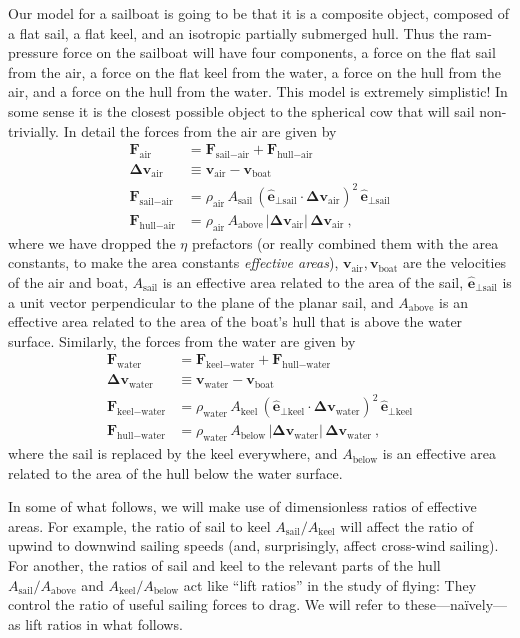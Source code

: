 \documentclass[letterpaper]{article}
\renewcommand{\vec}[1]{\boldsymbol{#1}}
\newcommand{\uvec}{\vec{\hat{e}}}
\newcommand{\air}{\text{air}}
\newcommand{\water}{\text{water}}
\newcommand{\boat}{\text{boat}}
\newcommand{\sail}{\text{sail}}
\newcommand{\keel}{\text{keel}}
\newcommand{\hull}{\text{hull}}
\renewcommand{\above}{\text{above}}
\newcommand{\below}{\text{below}}
\newcommand{\vair}{\vec{v}_\air}
\newcommand{\vwater}{\vec{v}_\water}
\newcommand{\vboat}{\vec{v}_\boat}
\begin{document}
Our model for a sailboat is going to be that it is a composite object, composed of a flat sail, a flat keel, and an isotropic partially submerged hull.
Thus the ram-pressure force on the sailboat will have four components, a force on the flat sail from the air, a force on the flat keel from the water, a force on the hull from the air, and a force on the hull from the water.
This model is extremely simplistic!
In some sense it is the closest possible object to the spherical cow that will sail non-trivially.
In detail the forces from the air are given by
\begin{align}\label{eq:startmodel}
  \vec{F}_\air &= \vec{F}_{\sail-\air} + \vec{F}_{\hull-\air}
  \\
  \vec{\Delta v}_\air &\equiv \vair - \vboat \label{eq:deltav}
  \\
  \vec{F}_{\sail-\air} & = \rho_\air\,A_\sail\,(\uvec_{\perp\sail}\cdot\vec{\Delta v}_\air)^2\,\uvec_{\perp\sail} \label{eq:Fsailair}
  \\
  \vec{F}_{\hull-\air} & = \rho_\air\,A_{\above}\,|\vec{\Delta v}_\air|\,\vec{\Delta v}_\air \label{eq:Fhullair} ~,
\end{align}
where we have dropped the $\eta$ prefactors (or really combined them with the area constants, to make the area constants \emph{effective areas}), $\vair,\vboat$ are the velocities of the air and boat, $A_\sail$ is an effective area related to the area of the sail, $\uvec_{\perp\sail}$ is a unit vector perpendicular to the plane of the planar sail, and $A_{\above}$ is an effective area related to the area of the boat's hull that is above the water surface.
Similarly, the forces from the water are given by
\begin{align}
  \vec{F}_\water &= \vec{F}_{\keel-\water} + \vec{F}_{\hull-\water}
  \\
  \vec{\Delta v}_\water &\equiv \vwater - \vboat
  \\
  \vec{F}_{\keel-\water} & = \rho_\water\,A_\keel\,(\uvec_{\perp\keel}\cdot\vec{\Delta v}_\water)^2\,\uvec_{\perp\keel}
  \\
  \vec{F}_{\hull-\water} & = \rho_\water\,A_{\below}\,|\vec{\Delta v}_\water|\,\vec{\Delta v}_\water ~,\label{eq:endmodel}
\end{align}
where the sail is replaced by the keel everywhere, and $A_{\below}$ is an effective area related to the area of the hull below the water surface.

In some of what follows, we will make use of dimensionless ratios of effective areas.
For example, the ratio of sail to keel $A_\sail/A_\keel$ will affect the ratio of upwind to downwind sailing speeds (and, surprisingly, affect cross-wind sailing).
For another, the ratios of sail and keel to the relevant parts of the hull $A_\sail/A_\above$ and $A_\keel/A_\below$ act like ``lift ratios'' in the study of flying:
They control the ratio of useful sailing forces to drag.
We will refer to these---na\"ively---as lift ratios in what follows.
\end{document}
